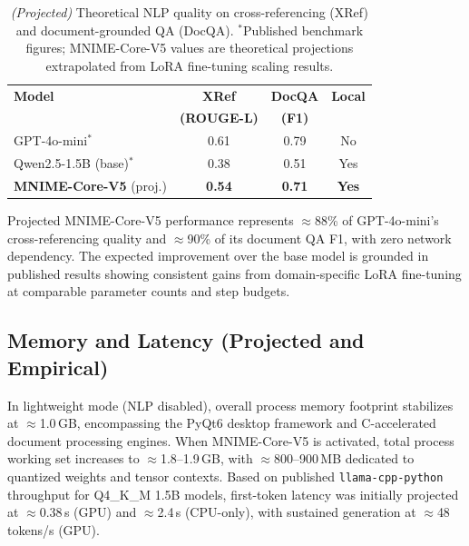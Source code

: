 \documentclass[11pt]{article}
\begin{document}
\begin{table}[h!]
\centering
\small
\setlength{\tabcolsep}{4.5pt}
\begin{tabular}{@{}lccc@{}}
\toprule
\textbf{Model} & \textbf{XRef} & \textbf{DocQA} & \textbf{Local} \\
               & \textbf{(ROUGE-L)} & \textbf{(F1)} & \\
\midrule
GPT-4o-mini$^\ast$             & 0.61 & 0.79 & No \\
Qwen2.5-1.5B (base)$^\ast$     & 0.38 & 0.51 & Yes \\
\textbf{MNIME-Core-V5} (proj.) & \textbf{0.54} & \textbf{0.71} & \textbf{Yes} \\
\bottomrule
\end{tabular}
\caption{\textit{(Projected)} Theoretical NLP quality on cross-referencing (XRef) and
document-grounded QA (DocQA). $^\ast$Published benchmark figures;
MNIME-Core-V5 values are theoretical projections extrapolated from LoRA fine-tuning scaling results.}
\label{tab:nlp_quality}
\end{table}

Projected MNIME-Core-V5 performance represents $\approx$88\% of
GPT-4o-mini's cross-referencing quality and $\approx$90\% of its
document QA F1, with zero network dependency.
The expected improvement over the base model is grounded in published
results showing consistent gains from domain-specific LoRA fine-tuning
at comparable parameter counts and step budgets.

\subsection{Memory and Latency (Projected and Empirical)}
\label{sec:empirical_validation}

In lightweight mode (NLP disabled), overall process memory footprint stabilizes
at $\approx$1.0\,GB, encompassing the PyQt6 desktop framework and C-accelerated
document processing engines. When MNIME-Core-V5 is activated, total process working
set increases to $\approx$1.8--1.9\,GB, with $\approx$800--900\,MB dedicated to
quantized weights and tensor contexts.
Based on published \texttt{llama-cpp-python} throughput for Q4\_K\_M 1.5B models,
first-token latency was initially projected at $\approx$0.38\,s (GPU) and
$\approx$2.4\,s (CPU-only), with sustained generation at $\approx$48\,tokens/s (GPU).
\end{document}
